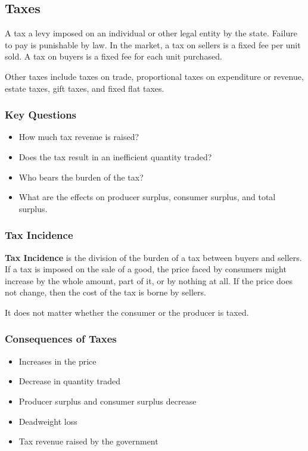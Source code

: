\documentclass[letterpaper, 12pt]{article}
\begin{document}
\subsection{Taxes}
A tax a levy imposed on an individual or other legal entity by the state.
Failure to pay is punishable by law. In the market, a tax on sellers is a fixed
fee per unit sold. A tax on buyers is a fixed fee for each unit purchased. \par
Other taxes include taxes on trade, proportional taxes on expenditure or
revenue, estate taxes, gift taxes, and fixed flat taxes.

\subsubsection{Key Questions}
\begin{itemize}
  \item How much tax revenue is raised?
  \item Does the tax result in an inefficient quantity traded?
  \item Who bears the burden of the tax?
  \item What are the effects on producer surplus, consumer surplus, and total
  surplus.
\end{itemize}

\subsubsection{Tax Incidence}
\textbf{Tax Incidence} is the division of the burden of a tax between buyers
and sellers. If a tax is imposed on the sale of a good, the price faced by
consumers might increase by the whole amount, part of it, or by nothing at all.
If the price does not change, then the cost of the tax is borne by sellers. \par
It does not matter whether the consumer or the producer is taxed.

\subsubsection{Consequences of Taxes}
\begin{itemize}
  \item Increases in the price
  \item Decrease in quantity traded
  \item Producer surplus and consumer surplus decrease
  \item Deadweight loss
  \item Tax revenue raised by the government
\end{itemize}
\end{document}
